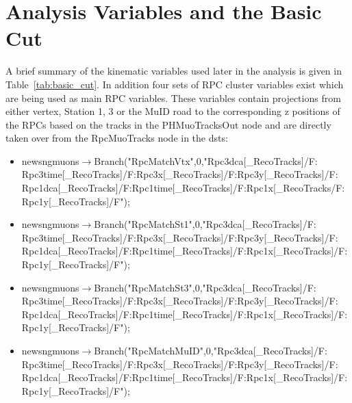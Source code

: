 \section{Analysis Variables and the Basic Cut}

A brief summary of the kinematic variables used later in the analysis is given
in Table~\ref{tab:basic_cut}. In addition four sets of RPC cluster variables exist
which are being used as main RPC variables. These variables contain
projections from either vertex, Station 1, 3 or the MuID road to the
corresponding z positions of the RPCs based on the tracks in the PHMuoTracksOut
node and are directly taken over from the RpcMuoTracks node in the dsts:

\begin{itemize}
\item newsngmuons$\rightarrow$Branch("RpcMatchVtx",0,"Rpc3dca[\_RecoTracks]/F:\\Rpc3time[\_RecoTracks]/F:Rpc3x[\_RecoTracks]/F:Rpc3y[\_RecoTracks]/F:\\Rpc1dca[\_RecoTracks]/F:Rpc1time[\_RecoTracks]/F:Rpc1x[\_RecoTracks/F:\\Rpc1y[\_RecoTracks]/F");
\item newsngmuons$\rightarrow$Branch("RpcMatchSt1",0,"Rpc3dca[\_RecoTracks]/F:\\Rpc3time[\_RecoTracks]/F:Rpc3x[\_RecoTracks]/F:Rpc3y[\_RecoTracks]/F:\\Rpc1dca[\_RecoTracks]/F:Rpc1time[\_RecoTracks]/F:Rpc1x[\_RecoTracks]/F:\\Rpc1y[\_RecoTracks]/F");
\item newsngmuons$\rightarrow$Branch("RpcMatchSt3",0,"Rpc3dca[\_RecoTracks]/F:\\Rpc3time[\_RecoTracks]/F:Rpc3x[\_RecoTracks]/F:Rpc3y[\_RecoTracks]/F:\\Rpc1dca[\_RecoTracks]/F:Rpc1time[\_RecoTracks]/F:Rpc1x[\_RecoTracks]/F:\\Rpc1y[\_RecoTracks]/F");
\item newsngmuons$\rightarrow$Branch("RpcMatchMuID",0,"Rpc3dca[\_RecoTracks]/F:\\Rpc3time[\_RecoTracks]/F:Rpc3x[\_RecoTracks]/F:Rpc3y[\_RecoTracks]/F:\\Rpc1dca[\_RecoTracks]/F:Rpc1time[\_RecoTracks]/F:Rpc1x[\_RecoTracks]/F:\\Rpc1y[\_RecoTracks]/F");
\end{itemize}

